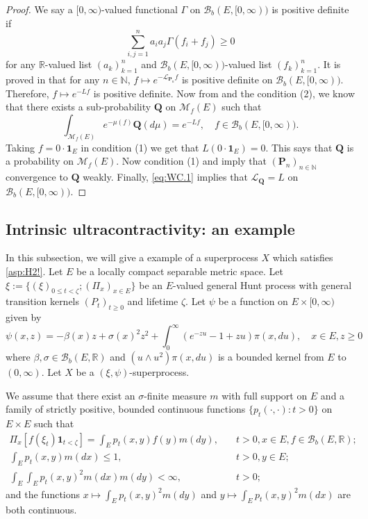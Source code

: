 \documentclass[12pt,a4paper]{amsart}
\numberwithin{equation}{section}
\theoremstyle{plain}
\theoremstyle{definition}
\theoremstyle{remark}
\begin{document}
\begin{proof}
	We say a $[0,\infty)$-valued functional $\Gamma$ on $\mathcal B_b(E,[0,\infty))$ is positive definite if
\[
	\sum_{i,j =1}^n a_i a_j \Gamma (f_i + f_j)\geq 0
\]
for any $\mathbb R$-valued list $(a_k)_{k = 1}^n$ and $\mathcal B_b(E,[0,\infty))$-valued list $(f_k)_{k = 1}^n$.
	It is proved in \cite[Theorem 3.3.3]{Dawson1992Infinitely} that for any $n \in \mathbb N$, $f\mapsto e^{- \mathscr L_{\mathbf P_n}f}$ is positive definite on $\mathcal B_b(E,[0,\infty))$.
	Therefore, $f \mapsto e^{- L f}$ is positive definite.
	Now from \cite[Corollary (A.6)]{Fitzsimmons1989Construction} and the condition (2), we know that there exists a sub-probability $\mathbf Q$ on $\mathcal M_f(E)$ such that
\begin{equation}	\label{eq:WC.1}
	\int_{\mathcal M_f(E)}e^{-\mu(f) } \mathbf Q(d\mu) = e^{-Lf}, \quad f \in \mathcal B_b(E,[0,\infty)).
\end{equation}
	Taking $f = 0 \cdot \mathbf 1_E$ in condition (1) we get that $L(0\cdot \mathbf 1_E) = 0$.
	This says that $\mathbf Q$ is a probability on $\mathcal M_f(E)$.
	Now condition (1) and \cite[Theorem 1.8]{Li2011MeasureValued} imply that $(\mathbf P_n)_{n \in \mathbb N}$ convergence to $\mathbf Q$ weakly.
	Finally, \eqref{eq:WC.1} implies that $\mathscr L_{\mathbf Q} = L$ on $\mathcal B_b(E,[0,\infty))$.
\end{proof}

\subsection{Intrinsic ultracontractivity: an example} \label{sec:example}
	In this subsection, we will give a example of a superprocess $X$ which satisfies \eqref{asp:H2!}.
	Let $E$ be a locally compact separable metric space.
	Let $\xi:= \{(\xi)_{0\leq t < \zeta}; (\Pi_x)_{x\in E}\}$ be an $E$-valued general Hunt process with general transition kernels $(P_t)_{t\geq 0}$ and lifetime $\zeta$.
	Let $\psi$ be a function on $E \times [0,\infty)$ given by
\begin{equation}
	\psi(x,z)
	=- \beta(x) z + \sigma(x)^2 z^2 + \int_0^\infty (e^{-zu} -1 + zu) \pi(x,du),
	\quad x\in E, z\geq 0
\end{equation}
	where $\beta, \sigma \in \mathcal B_b(E,\mathbb R)$ and $(u \wedge u^2) \pi(x,du)$ is a bounded kernel from $E$ to $(0,\infty)$.
	Let $X$ be a $(\xi, \psi)$-superprocess.

	We assume  that there exist an $\sigma$-finite measure $m$ with full support on $E$ and a family of strictly positive, bounded continuous functions $\{p_t(\cdot,\cdot): t>0\}$ on $E\times E$ such that
\begin{align}
	\Pi_x[f(\xi_t) \mathbf 1_{t< \zeta}] = \int_E p_t(x,y) f(y)m(dy), & \quad t>0, x\in E, f\in \mathcal B_b(E,\mathbb R);
	\\ \int_E p_t(x,y) m(dx) \leq 1, &\quad t>0, y\in E;
	\\ \int_E \int_E p_t(x,y)^2 m(dx)m(dy) < \infty, &\quad t>0;
\end{align}
	and the functions $x \mapsto \int_E p_t(x,y)^2m(dy)$ and $y\mapsto \int_E p_t(x,y)^2m(dx)$ are both continuous.
\end{document}
